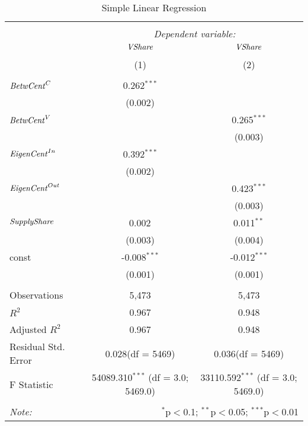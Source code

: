 \begin{table}[!htbp] \centering
  \caption{Simple Linear Regression}
\begin{tabular}{@{\extracolsep{5pt}}lcc}
\\[-1.8ex]\hline
\hline \\[-1.8ex]
& \multicolumn{2}{c}{\textit{Dependent variable:}} \
\cr \cline{2-3}
\\[-1.8ex] & \multicolumn{1}{c}{${\it VShare}$} & \multicolumn{1}{c}{${\it VShare}$}  \\
\\[-1.8ex] & (1) & (2) \\
\hline \\[-1.8ex]
 ${\it BetwCent}^C$ & 0.262$^{***}$ & \\
  & (0.002) & \\
 ${\it BetwCent}^V$ & & 0.265$^{***}$ \\
  & & (0.003) \\
 ${\it EigenCent}^{In}$ & 0.392$^{***}$ & \\
  & (0.002) & \\
 ${\it EigenCent}^{Out}$ & & 0.423$^{***}$ \\
  & & (0.003) \\
 ${\it SupplyShare}$ & 0.002$^{}$ & 0.011$^{**}$ \\
  & (0.003) & (0.004) \\
 const & -0.008$^{***}$ & -0.012$^{***}$ \\
  & (0.001) & (0.001) \\
\hline \\[-1.8ex]
 Observations & 5,473 & 5,473 \\
 $R^2$ & 0.967 & 0.948 \\
 Adjusted $R^2$ & 0.967 & 0.948 \\
 Residual Std. Error & 0.028(df = 5469) & 0.036(df = 5469)  \\
 F Statistic & 54089.310$^{***}$ (df = 3.0; 5469.0) & 33110.592$^{***}$ (df = 3.0; 5469.0) \\
\hline
\hline \\[-1.8ex]
\textit{Note:} & \multicolumn{2}{r}{$^{*}$p$<$0.1; $^{**}$p$<$0.05; $^{***}$p$<$0.01} \\
\end{tabular}
\end{table}
